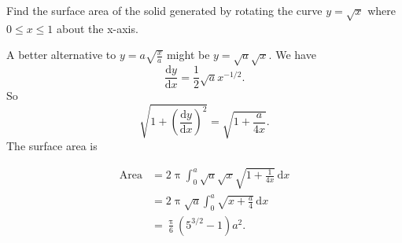 \documentclass[12pt,fleqn,answers]{exam}
\begin{document}
\begin{questions}
\begin{solution}[2.5in]
\end{solution}    

\newpage
\question[5] Find the surface area of
the solid generated by rotating the curve $y = \sqrt{x}$
 where $0 \leq x \leq 1$ about the x-axis.  

\begin{solution}
A better alternative to $y = a \sqrt{\frac{x}{a}}$
might be $y = \sqrt{a} \sqrt{x}$. We have
\begin{equation}
  \frac{\mathrm{d} y}{\mathrm{d} x} = \frac{1}{2} \sqrt{a} x^{-1/2}.
\end{equation}
So 
\begin{equation}
  \sqrt{1 + \left(\frac{\mathrm{d} y}{\mathrm{d} x}\right)^2}
     = \sqrt{1 + \frac{a}{4 x}}.
\end{equation}
The surface area is 

\begin{align*}
  \text{Area} &= 2 \uppi \int_0^a  \sqrt{a} \sqrt{x} 
  \sqrt{1 + \frac{1}{4 x}} \, \mathrm{d} x \\
  &= 2 \uppi \sqrt{a} \int_0^a \sqrt{x + \frac{a}{4}} \, \mathrm{d} x \\
  &= \frac{\uppi}{6} \left(5^{3/2} - 1 \right) a^2.
\end{align*}
\end{solution}
  \end{questions}
\end{document}
